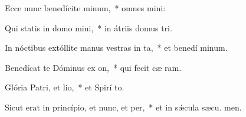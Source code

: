 \item Ecce nunc benedícite minum,~* omnes  mini:
\item Qui statis in domo mini,~* in átriis domus  tri.
\item In nóctibus extóllite manus vestras in ta,~* et benedí minum.
\item Benedícat te Dóminus ex on,~* qui fecit cæ  ram.
\item Glória Patri, et lio,~* et Spirí to.
\item Sicut erat in princípio, et nunc, et per,~* et in sǽcula sæcu. men.
